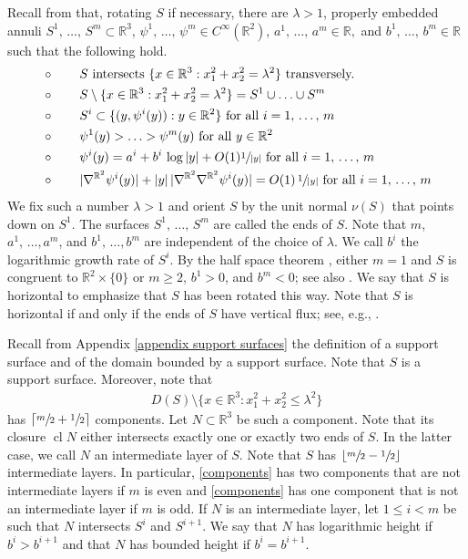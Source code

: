 \documentclass[11pt]{amsart}
\DeclarePairedDelimiter\ceil{\lceil}{\rceil}
\DeclarePairedDelimiter\floor{\lfloor}{\rfloor}
\begin{document}
\begin{appendices}
Recall from \cite[Proposition 1]{Schoen} that, rotating $S$ if necessary, there are $\lambda>1$,   properly embedded annuli $S^1,\,\ldots, \,S^m\subset \mathbb{R}^3$, $\psi^1,\,\ldots,\, \psi^m\in C^\infty(\mathbb{R}^2)$, $a^1,\,\ldots,\, a^m\in \mathbb{R},$ and $b^1,\,\ldots,\, b^m\in \mathbb{R}$  such that the following hold.
\begin{align*}
	&\circ \qquad  \text{$S$ intersects $\{x\in \mathbb{R}^3:x_1^2+x_2^2=\lambda^2\}$ transversely.} \\
	&\circ\qquad 	S\setminus \{x\in \mathbb{R}^3:x_1^2+x_2^2=\lambda^2\}=S^1\cup\ldots\cup S^m\\
	&\circ \qquad \text{$S^i\subset \{(y,\psi^i(y)):y\in \mathbb{R}^2\}$ for all $i=1,\,\ldots,\,m$} \\
	&\circ\qquad \text{$\psi^1(y)>\ldots >\psi^m(y)$ for all $y\in \mathbb{R}^2$} \\
	&\circ \qquad \psi^i(y)=a^i+b^i\,\log|y|+O(1)\sfrac{1}{|y|}\text{ for all $i=1,\,\ldots,\,m$}\\
	&\circ \qquad |\nabla^{\mathbb{R}^2}\psi^i(y)|+|y|\,|\nabla^{\mathbb{R}^2}\nabla^{\mathbb{R}^2}\psi^i(y)|=O(1)\,\sfrac{1}{|y|}\text{ for all $i=1,\,\ldots,\,m$}
\end{align*}
We fix such a number $\lambda>1$ and  orient $S$ by the unit normal $\nu(S)$ that points down  on $S^1$. The surfaces $S^1,\,\ldots,\,S^m$ are called the ends of $S$. Note that $m$, $a^1,\,\ldots, a^m$, and $b^1,\,\ldots, b^m$ are independent of the choice of $\lambda$. We call $b^i$ the logarithmic growth rate of $S^i$.  By the half space theorem \cite{HoffmanMeekshalfspace},  either $m=1$ and $S$ is congruent to $\mathbb{R}^2\times\{0\}$ or  $m\geq 2$, $b^1>0$, and $b^m<0$; see also \cite[\S2]{Schoen}. We say that  $S$ is horizontal to emphasize that $S$ has been rotated this way. Note that $S$ is horizontal if and only if the ends of $S$ have vertical flux; see, e.g., \cite{hoffmanmeeks}.

Recall from Appendix \ref{appendix support surfaces} the definition of a support surface and of the domain bounded by a support surface. Note that $S$ is a support surface. Moreover,
note that 
\begin{align} \label{components} 
	D(S)\setminus \{x\in \mathbb{R}^3:x_1^2+x_2^2\leq \lambda^2\}
\end{align} has $\ceil{\sfrac{m}{2}+\sfrac12}$ 
components. Let $N\subset \mathbb{R}^3$ be such a component. Note that its closure $\operatorname{cl} N$ either intersects exactly one or exactly two ends of $S$. In the latter case, we call $N$ an intermediate layer of $S$. Note that $S$ has $\floor{\sfrac{m}{2}-\sfrac12}$ 
intermediate layers. In particular,  \eqref{components} has two components that are not intermediate layers if $m$ is even and \eqref{components} has one component that is not an intermediate layer if $m$ is odd. If $N$ is an intermediate layer, let $1\leq i<m$ be such that $N$ intersects $S^i$ and $S^{i+1}$. We say that $N$ has logarithmic height if $b^{i}>b^{i+1}$ and that $N$ has bounded height if $b^i=b^{i+1}$. 

\end{appendices}
\end{document}
